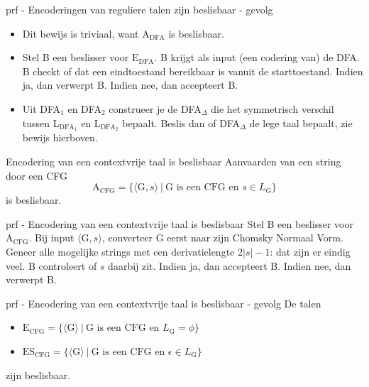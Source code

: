 \begin{prf}{prf - Encoderingen van reguliere talen zijn beslisbaar - gevolg}
    \begin{itemize}
        \item 
            Dit bewijs is triviaal, want A$_{\text{DFA}}$ is beslisbaar.
        \item 
            Stel B een beslisser voor $\text{E}_{\text{DFA}}$. B krijgt als input (een codering van) de DFA\@. B checkt of dat een eindtoestand bereikbaar is vanuit de starttoestand. Indien ja, dan verwerpt B. Indien nee, dan accepteert B.
        \item 
            Uit DFA$_1$ en DFA$_2$ construeer je de DFA$_{\Delta}$ die het symmetrisch verschil tussen L$_{\text{DFA}_1}$ en L$_{\text{DFA}_2}$ bepaalt. Beslis dan of DFA$_{\Delta}$ de lege taal bepaalt, zie bewijs hierboven.
    \end{itemize}
    \vspace{-0.3cm}
\end{prf}

\begin{lem}{Encodering van een contextvrije taal is beslisbaar}
    \vspace{-0.1cm}
    Aanvaarden van een string door een CFG
    \begin{equation*}
        \text{A}_{\text{CFG}} = \{\langle \text{G}, s\rangle\  | \ \text{G is een CFG en $s \in L_{\text{G}}$} \}
    \end{equation*}
    is beslisbaar.
    \vspace{-0.1cm}
\end{lem}

\begin{prf}{prf - Encodering van een contextvrije taal is beslisbaar}
    Stel B een beslisser voor $\text{A}_{\text{CFG}}$. Bij input $\langle \text{G}, s\rangle$, converteer G eerst naar zijn Chomsky Normaal Vorm. Geneer alle mogelijke strings met een derivatielengte $2|s| - 1$: dat zijn er eindig veel. B controleert of $s$ daarbij zit. Indien ja, dan accepteert B. Indien nee, dan verwerpt B.
\end{prf}

\begin{lem}{prf - Encodering van een contextvrije taal is beslisbaar - gevolg}
    De talen
    \begin{itemize}
        \item 
            $ \text{E}_{\text{CFG}} = \{\langle \text{G} \rangle\  | \ \text{G is een CFG en $L_{\text{G}} = \phi$} \}$
        \item 
            $ \text{ES}_{\text{CFG}} = \{\langle \text{G} \rangle\  | \ \text{G is een CFG en $\epsilon \in L_{\text{G}}$} \}$
    \end{itemize}
    zijn beslisbaar.
\end{lem}

